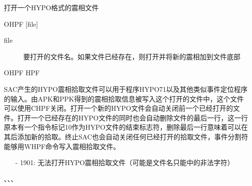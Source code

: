 \label{cmd:ohpf}

打开一个HYPO格式的震相文件

\begin{SACSTX}
OHPF [file]
\end{SACSTX}

\begin{description}
\item [file]  要打开的文件名。如果文件已经存在，则打开并将新的震相加到文件底部
\end{description}

\begin{SACDFT}
OHPF HPF
\end{SACDFT}

SAC产生的HYPO震相拾取文件可以用于程序HYPO71以及其他类似事件定位程序的输入。由APK和PPK得到的震相拾取信息被写入这个打开的文件中，这个文件可以使用CHPF关闭。打开一个新的HYPO文件会自动关闭前一个已经打开的文件。打开一个已经存在的HYPO文件的同时也会自动删除文件的最后一行，这一行原本有一个指令标记10作为HYPO文件的结束标志符，删除最后一行意味着可以在其后添加新的拾取。终止SAC也会自动关闭任何已经打开的拾取文件，事件分割符能够用WHPF命令写入震相拾取文件。

\begin{itemize}
\item[-]1901: 无法打开HYPO震相拾取文件（可能是文件名只能中的非法字符）
\end{itemize}

、、、
